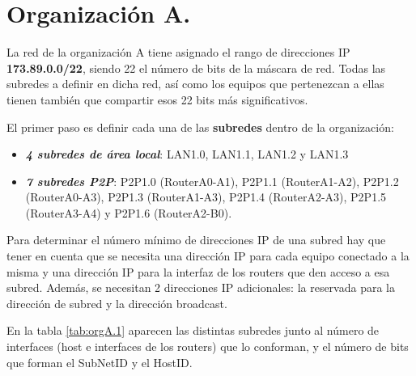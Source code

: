 	
\section{Organización A.}

\par La red de la organización A tiene asignado el rango de direcciones IP \textbf{173.89.0.0/22}, siendo 22 el número de bits de la máscara de red. Todas las subredes a definir en dicha red, así como los equipos que pertenezcan a ellas tienen también que compartir esos 22 bits más significativos.
\par El primer paso es definir cada una de las \textbf{subredes} dentro de la organización:
\begin{itemize}
	\item \emph{\textbf{4 subredes de área local}}: LAN1.0, LAN1.1, LAN1.2  y LAN1.3
	\item \emph{\textbf{7 subredes P2P}}: P2P1.0 (RouterA0-A1), P2P1.1 (RouterA1-A2), P2P1.2 (RouterA0-A3), P2P1.3 (RouterA1-A3), P2P1.4 (RouterA2-A3), P2P1.5 (RouterA3-A4) y P2P1.6 (RouterA2-B0).
\end{itemize}
\par Para determinar el número mínimo de direcciones IP de una subred hay que tener en cuenta que se necesita una dirección IP para cada equipo conectado a la misma y una dirección IP para la interfaz de los routers que den acceso a esa subred. Además, se necesitan 2 direcciones IP adicionales: la reservada para la dirección de subred y la dirección broadcast.
\par En la tabla \ref{tab:orgA.1} aparecen las distintas subredes junto al número de interfaces (host e interfaces de los routers) que lo conforman, y el número de bits que forman el SubNetID y el HostID.
